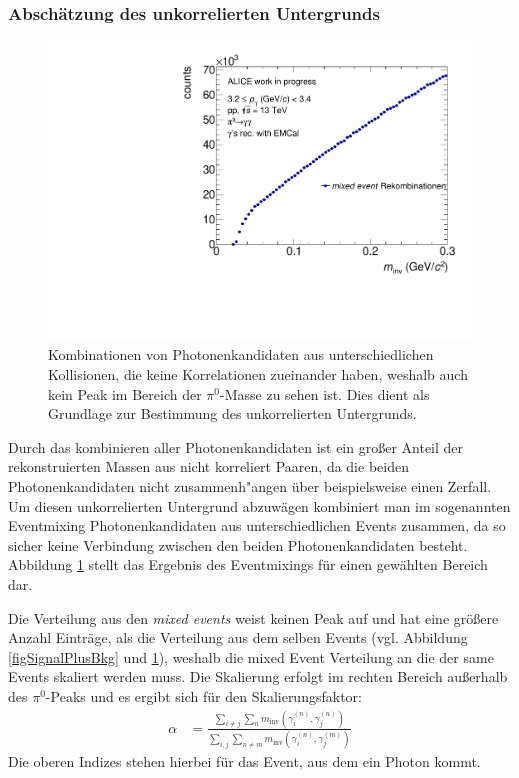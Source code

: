 \documentclass[11pt]{article}
\begin{document}
	\subsubsection{Absch{\"a}tzung des unkorrelierten Untergrunds}
	\label{sssec:num3}

	\begin{figure}[tbp]
		\centering
		\includegraphics[width=.7\linewidth]{hUncorrBkg.pdf}
		\caption{Kombinationen von Photonenkandidaten aus unterschiedlichen Kollisionen, die keine Korrelationen zueinander haben, weshalb auch kein Peak im Bereich der $\pi^{0}$-Masse zu sehen ist. Dies dient als Grundlage zur Bestimmung des unkorrelierten Untergrunds.}
		\label{figUncorrBkg}
	\end{figure}

	Durch das kombinieren aller Photonenkandidaten ist ein gro{\ss}er Anteil der rekonstruierten Massen aus nicht korreliert Paaren, da die beiden Photonenkandidaten nicht zusammenh{"a}ngen {\"u}ber beispielsweise einen Zerfall. Um diesen unkorrelierten Untergrund abzuw{\"a}gen kombiniert man im sogenannten Eventmixing Photonenkandidaten aus unterschiedlichen Events zusammen, da so sicher keine Verbindung zwischen den beiden Photonenkandidaten besteht. Abbildung \ref{figUncorrBkg} stellt das Ergebnis des Eventmixings f{\"u}r einen gew{\"a}hlten Bereich dar.

	Die Verteilung aus den {\it mixed events} weist keinen Peak auf und hat eine gr{\"o}{\ss}ere Anzahl Eintr{\"a}ge, als die Verteilung aus dem selben Events (vgl. Abbildung \ref{figSignalPlusBkg} und \ref{figUncorrBkg}), weshalb die mixed Event Verteilung an die der same Events skaliert werden muss. Die Skalierung erfolgt im rechten Bereich au{\ss}erhalb des $\pi^{0}$-Peaks und es ergibt sich f{\"u}r den Skalierungsfaktor:
	\begin{align}
	\label{eqBackSkalierung}
	\alpha &= \frac{\sum_{i \neq j}\sum_{n}m_{\text{inv}}\left( \gamma^{(n)}_{i},\gamma^{(n)}_{j}\right) }{\sum_{i,j}\sum_{n \neq m}m_{\text{inv}}\left( \gamma^{(n)}_{i},\gamma^{(m)}_{j}\right) }
	\end{align}
	Die oberen Indizes stehen hierbei f{\"u}r das Event, aus dem ein Photon kommt.\newline
\end{document}
